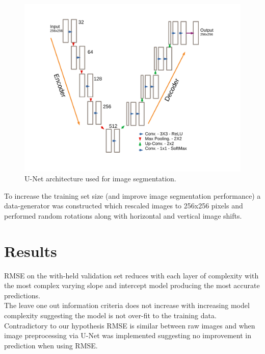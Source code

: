 \documentclass[isoft]{poster_class_UofC}
\begin{document}
\begin{poster}
                \vspace{1cm}
        \begin{figure}
                    \centering
            \captionsetup{type=figure}
            \includegraphics[scale=.8]{./images/UNet_Arch.pdf}
            \caption{U-Net architecture used for image segmentation.}
            \label{fig:U-NET}
        \end{figure}
              \vspace{1cm}
              
To increase the training set size (and improve image segmentation performance) a data-generator was constructed which rescaled images to 256x256 pixels and performed random rotations along with horizontal and vertical image shifts.


        \section{Results}%
RMSE on the with-held validation set reduces with each layer of complexity with the most complex varying slope and intercept model producing the most accurate predictions. \\

The leave one out information criteria \cite{VehtariAki2017PBme} does not increase with increasing model complexity suggesting the model is not over-fit to the training data. \\

Contradictory to our hypothesis RMSE is similar between raw images and when image preprocessing via U-Net was implemented suggesting no improvement in prediction when using RMSE.


\end{poster}
\end{document}

